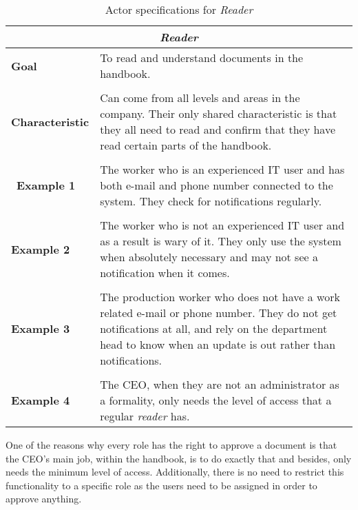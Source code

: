 \begin{table}[H]
	\centering
	\begin{tabular}{l p{11.3cm}}
		\hline
		\multicolumn{2}{c}{\textbf{\textit{Reader}}}\\
		\hline

		\textbf{Goal} & To read and understand documents in the handbook. \\
		&  \\

		\textbf{Characteristic} & Can come from all levels and areas in the company.
		Their only shared characteristic is that they all need to read and confirm that they have read certain parts of the handbook.\\
		&  \\
		\
		\textbf{Example 1}
		& The worker who is an experienced IT user and has both e-mail and phone number connected to the system.
		They check for notifications regularly.\\
		&  \\

		\textbf{Example 2}
		& The worker who is not an experienced IT user and as a result is wary of it.
		They only use the system when absolutely necessary and may not see a notification when it comes.\\

		&  \\
		\textbf{Example 3}
		& The production worker who does not have a work related e-mail or phone number.
		They do not get notifications at all, and rely on the department head to know when an update is out rather than notifications.\\
		&  \\

		\textbf{Example 4}
		& The CEO, when they are not an administrator as a formality, only needs the level of access that a regular \textit{reader} has.\\
		\hline
	\end{tabular}
	\caption{Actor specifications for \textit{Reader}}\label{tab:Actor-reader}
\end{table}

One of the reasons why every role has the right to approve a document is that the CEO's main job, within the handbook, is to do exactly that and besides, only needs the minimum level of access.
Additionally, there is no need to restrict this functionality to a specific role as the users need to be assigned in order to approve anything.
